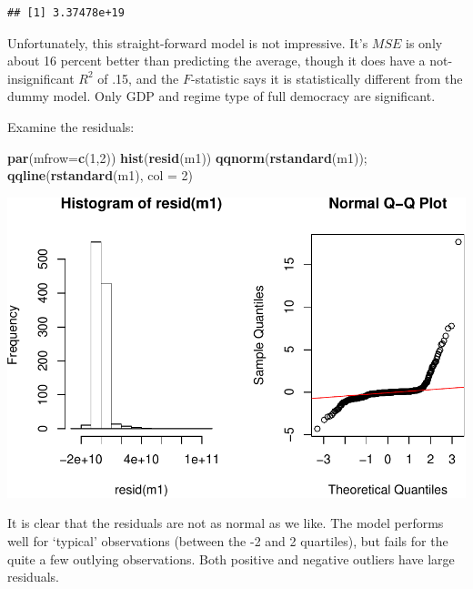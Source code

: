 \documentclass[11pt,]{article}
\newenvironment{Shaded}{\begin{snugshade}}{\end{snugshade}}
\newcommand{\DataTypeTok}[1]{\textcolor[rgb]{0.13,0.29,0.53}{#1}}
\newcommand{\DecValTok}[1]{\textcolor[rgb]{0.00,0.00,0.81}{#1}}
\newcommand{\KeywordTok}[1]{\textcolor[rgb]{0.13,0.29,0.53}{\textbf{#1}}}
\newcommand{\NormalTok}[1]{#1}
\begin{document}
\begin{verbatim}
## [1] 3.37478e+19
\end{verbatim}

Unfortunately, this straight-forward model is not impressive. It's
\(MSE\) is only about 16 percent better than predicting the average,
though it does have a not-insignificant \(R^2\) of .15, and the
\(F\)-statistic says it is statistically different from the dummy model.
Only GDP and regime type of full democracy are significant.

Examine the residuals:

\begin{Shaded}
\begin{Highlighting}[]
\KeywordTok{par}\NormalTok{(}\DataTypeTok{mfrow=}\KeywordTok{c}\NormalTok{(}\DecValTok{1}\NormalTok{,}\DecValTok{2}\NormalTok{))}
\KeywordTok{hist}\NormalTok{(}\KeywordTok{resid}\NormalTok{(m1))}
\KeywordTok{qqnorm}\NormalTok{(}\KeywordTok{rstandard}\NormalTok{(m1)); }\KeywordTok{qqline}\NormalTok{(}\KeywordTok{rstandard}\NormalTok{(m1), }\DataTypeTok{col =} \DecValTok{2}\NormalTok{)}
\end{Highlighting}
\end{Shaded}

\includegraphics{report_files/figure-latex/unnamed-chunk-18-1.pdf}

It is clear that the residuals are not as normal as we like. The model
performs well for `typical' observations (between the -2 and 2
quartiles), but fails for the quite a few outlying observations. Both
positive and negative outliers have large residuals.
\end{document}
